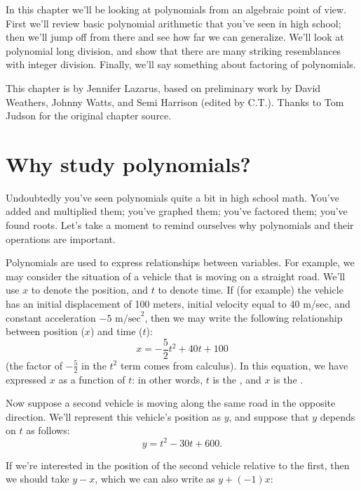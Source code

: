 
 

 In this chapter we'll be looking at  polynomials from an algebraic point of view. First we'll review basic  polynomial arithmetic that you've seen in high school; then we'll jump off from there and see how far we can generalize. We'll look at polynomial long division, and show that there are many striking resemblances with integer division. Finally, we'll say something about factoring of polynomials.
\bigskip

This chapter is by Jennifer Lazarus, based on preliminary work by David Weathers, Johnny Watts, and Semi Harrison (edited by C.T.). Thanks to Tom Judson for the original chapter source.

\section{Why study polynomials?}
\label{sec:WhyStudyPolynomials}
Undoubtedly you've seen polynomials quite a bit in high school math. You've added and multiplied them; you've graphed them; you've factored them; you've found roots. Let's take a moment to remind ourselves why polynomials and their operations are important.	

Polynomials are used to express relationships between variables. For example, we may consider the situation  of a vehicle that is moving on a straight road. We'll use $x$ to denote the position, and $t$ to denote time.   If (for example) the vehicle has an initial displacement of 100 meters, initial velocity equal to 40 m/sec, and constant acceleration $-5$ $\text{m/sec}^2$, then we may write the following relationship between position ($x$) and time ($t$):
$$ x =  -\frac{5}{2} t^2+ 40t + 100$$
(the factor of $-\frac{5}{2}$ in the $t^2$ term comes from calculus). In this equation, we have expressed $x$ as a function of $t$: in other words, $t$ is the , and $x$ is the .

Now suppose a second vehicle is moving along the same road  in the opposite direction. We'll represent this vehicle's position as $y$, and suppose that $y$ depends on $t$ as follows:
$$ y =   t^2- 30t + 600.$$

If we're interested in the position of the second vehicle relative to the first, then we should take $y - x$, which we can also write as $y + (-1)x$:

